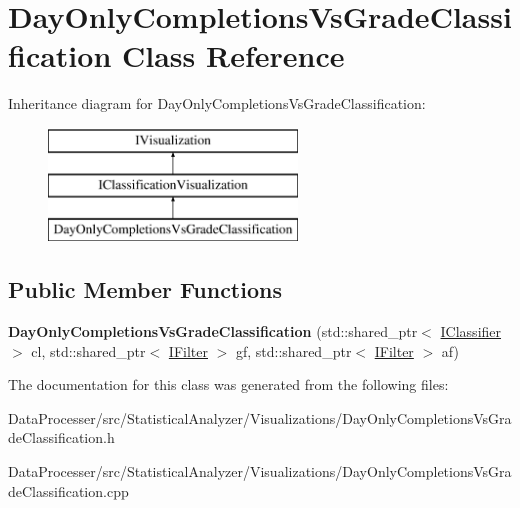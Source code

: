 \hypertarget{classDayOnlyCompletionsVsGradeClassification}{}\section{Day\+Only\+Completions\+Vs\+Grade\+Classification Class Reference}
\label{classDayOnlyCompletionsVsGradeClassification}
Inheritance diagram for Day\+Only\+Completions\+Vs\+Grade\+Classification\+:\begin{figure}[H]
\begin{center}
\leavevmode
\includegraphics[height=3.000000cm]{classDayOnlyCompletionsVsGradeClassification}
\end{center}
\end{figure}
\subsection*{Public Member Functions}
\begin{DoxyCompactItemize}
\item 
\mbox{\label{classDayOnlyCompletionsVsGradeClassification_a395e1c9dd3e409acebb7d31bdeadbd14}} 
{\bfseries Day\+Only\+Completions\+Vs\+Grade\+Classification} (std\+::shared\+\_\+ptr$<$ \hyperlink{classIClassifier}{I\+Classifier} $>$ cl, std\+::shared\+\_\+ptr$<$ \hyperlink{classIFilter}{I\+Filter} $>$ gf, std\+::shared\+\_\+ptr$<$ \hyperlink{classIFilter}{I\+Filter} $>$ af)
\end{DoxyCompactItemize}


The documentation for this class was generated from the following files\+:\begin{DoxyCompactItemize}
\item 
Data\+Processer/src/\+Statistical\+Analyzer/\+Visualizations/Day\+Only\+Completions\+Vs\+Grade\+Classification.\+h\item 
Data\+Processer/src/\+Statistical\+Analyzer/\+Visualizations/Day\+Only\+Completions\+Vs\+Grade\+Classification.\+cpp\end{DoxyCompactItemize}
